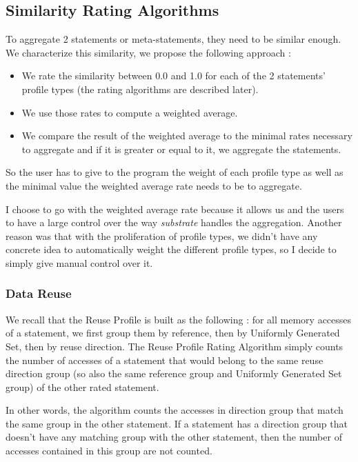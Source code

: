 \documentclass[paper=a4, fontsize=11.5pt]{scrartcl}
\numberwithin{equation}{section}        %
\numberwithin{figure}{section}          %
\numberwithin{table}{section}               %
\begin{document}
    \subsection{Similarity Rating Algorithms}
    To aggregate 2 statements or meta-statements, they need to be similar enough. We characterize
    this similarity, we propose the following approach :
    \begin{itemize}
        \item We rate the similarity between 0.0 and 1.0 for each of the 2 statements' profile types
            (the rating algorithms are described later).
        \item We use those rates to compute a weighted average.
        \item We compare the result of the weighted average to the minimal rates necessary
            to aggregate and if it is greater or equal to it, we aggregate the statements.
    \end{itemize}
    So the user has to give to the program the weight of each profile type as well as the
    minimal value the weighted average rate needs to be to aggregate.


    I choose to go with the weighted average rate because it allows us and the users
    to have a large control over the way \textit{substrate} handles the aggregation.
    Another reason was that with the proliferation of profile types, we didn't have
    any concrete idea to automatically weight the different profile types, so I decide
    to simply give manual control over it.
        \subsubsection{Data Reuse}
            We recall that the Reuse Profile is built as the following : for all memory accesses of
            a statement, we first group them by reference, then by Uniformly Generated Set,
            then by reuse direction. The Reuse Profile Rating Algorithm simply counts
            the number of accesses of a statement that would belong to the same reuse
            direction group (so also the same reference group and Uniformly Generated Set group)
            of the other rated statement.
            
            In other words, the algorithm counts the accesses in direction group that match
            the same group in the other statement. If a statement has a direction group that doesn't
            have any matching group with the other statement, then the number of accesses contained
            in this group are not counted.
\end{document}
